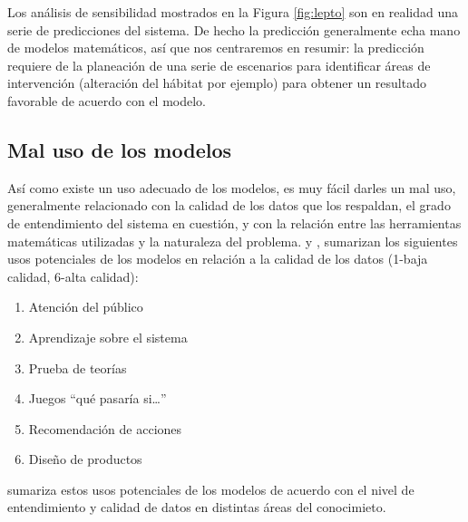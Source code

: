 \documentclass[
]{book}
\providecommand{\tightlist}{%
  \setlength{\itemsep}{0pt}\setlength{\parskip}{0pt}}
\begin{document}
Los análisis de sensibilidad mostrados en la Figura \ref{fig:lepto} son en realidad una serie de predicciones del sistema. De hecho la predicción generalmente echa mano de modelos matemáticos, así que nos centraremos en resumir: la predicción requiere de la planeación de una serie de escenarios para identificar áreas de intervención (alteración del hábitat por ejemplo) para obtener un resultado favorable de acuerdo con el modelo.

\hypertarget{mal-uso-de-los-modelos}{%
\subsection{Mal uso de los modelos}\label{mal-uso-de-los-modelos}}

Así como existe un uso adecuado de los modelos, es muy fácil darles un mal uso, generalmente relacionado con la calidad de los datos que los respaldan, el grado de entendimiento del sistema en cuestión, y con la relación entre las herramientas matemáticas utilizadas y la naturaleza del problema. \citet{holling1978adaptive} y \citet{karplus1975place}, sumarizan los siguientes usos potenciales de los modelos en relación a la calidad de los datos (1-baja calidad, 6-alta calidad):

\begin{enumerate}
\def\labelenumi{\arabic{enumi}.}
\tightlist
\item
  Atención del público
\item
  Aprendizaje sobre el sistema
\item
  Prueba de teorías
\item
  Juegos ``qué pasaría si\ldots{}''
\item
  Recomendación de acciones
\item
  Diseño de productos
\end{enumerate}

\citet{haefner1998modeling} sumariza estos usos potenciales de los modelos de acuerdo con el nivel de entendimiento y calidad de datos en distintas áreas del conocimieto.
\end{document}
